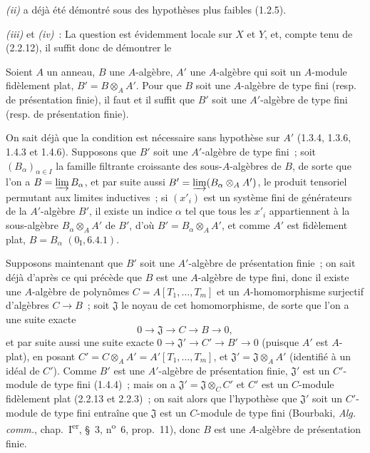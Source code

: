 \emph{(ii)} a déjà été démontré sous des hypothèses plus faibles (1.2.5).

\emph{(iii)} et \emph{(iv)}~: La question est évidemment locale sur $X$ et
$Y$, et, compte tenu de (2.2.12), il suffit donc de démontrer le

\begin{lemma}[2.7.1.1]
\label{IV.2.7.1.1-fr}
Soient $A$ un anneau, $B$ une $A$-algèbre, $A'$ une $A$-algèbre qui soit un
$A$-module fidèlement plat, $B'=B\otimes_A A'$. Pour que $B$ soit une
$A$-algèbre de type fini (resp. de présentation finie), il faut et il suffit
que $B'$ soit une $A'$-algèbre de type fini (resp. de présentation finie).
\end{lemma}

On sait déjà que la condition est nécessaire sans hypothèse sur $A'$
(1.3.4, 1.3.6, 1.4.3 et 1.4.6). Supposons que $B'$ soit une $A'$-algèbre de
type fini~; soit $(B_\alpha)_{\alpha\in I}$ la famille filtrante croissante
des sous-$A$-algèbres de $B$, de sorte que l'on a
$B=\varinjlim B_\alpha$, et par suite aussi
$B'=\varinjlim(B_\alpha\otimes_A A')$, le produit tensoriel permutant aux
limites inductives~; si $(x'_i)$ est un système fini de générateurs de la
$A'$-algèbre $B'$, il existe un indice $\alpha$ tel que tous les $x'_i$
appartiennent à la sous-algèbre $B_\alpha\otimes_A A'$ de $B'$, d'où
$B'=B_\alpha\otimes_A A'$, et comme $A'$ est fidèlement plat,
$B=B_\alpha$ $(0_{\mathrm I},6.4.1)$.

Supposons maintenant que $B'$ soit une $A'$-algèbre de présentation finie~;
on sait déjà d'après ce qui précède que $B$ est une $A$-algèbre de type fini,
donc il existe une $A$-algèbre de polynômes
$C=A[T_1,\ldots,T_m]$ et un $A$-homomorphisme surjectif d'algèbres
$C\to B$~; soit $\mathfrak J$ le noyau de cet homomorphisme, de sorte que
l'on a une suite exacte
\[
0\to\mathfrak J\to C\to B\to0,
\]
et par suite aussi une suite exacte $0\to\mathfrak J'\to C'\to B'\to0$
(puisque $A'$ est $A$-plat), en posant
$C'=C\otimes_A A'=A'[T_1,\ldots,T_m]$, et
$\mathfrak J'=\mathfrak J\otimes_A A'$ (identifié à un idéal de $C'$).
Comme $B'$ est une $A'$-algèbre de présentation finie, $\mathfrak J'$ est un
$C'$-module de type fini (1.4.4)~; mais on a
$\mathfrak J'=\mathfrak J\otimes_C C'$ et $C'$ est un $C$-module fidèlement
plat (2.2.13 et 2.2.3)~; on sait alors que l'hypothèse que $\mathfrak J'$ soit
un $C'$-module de type fini entraîne que $\mathfrak J$ est un $C$-module de
type fini (Bourbaki, \emph{Alg. comm.}, chap.~I\textsuperscript{er}, \S~3,
n\textsuperscript{o}~6, prop.~11), donc $B$ est une $A$-algèbre de
présentation finie.

